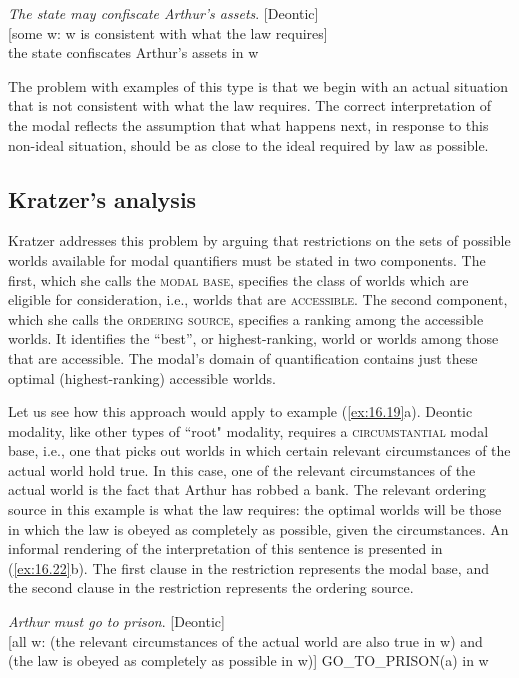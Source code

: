 \ea \label{ex:16.21}
\ea  \textit{The state may confiscate Arthur’s assets}. \hfill  [Deontic]\\
\ex{} [some w: w is consistent with what the law requires]\\
  the state confiscates Arthur’s assets in w
\z
\z


The problem with examples of this type is that we begin with an actual situation that is not consistent with what the law requires. The correct interpretation of the modal reflects the assumption that what happens next, in response to this non-ideal situation, should be as close to the ideal required by law as possible.


\subsection{Kratzer’s analysis}\label{sec:16.3.2}

Kratzer addresses this problem by arguing that restrictions on the sets of possible worlds available for modal quantifiers must be stated in two components. The first, which she calls the \textsc{modal base}, specifies the class of worlds which are eligible for consideration, i.e., worlds that are \textsc{accessible}. The second component, which she calls the \textsc{ordering source}, specifies a ranking among the accessible worlds. It identifies the “best”, or highest-ranking, world or worlds among those that are accessible. The modal’s domain of quantification contains just these optimal (highest-ranking) accessible worlds.



Let us see how this approach would apply to example (\ref{ex:16.19}a). Deontic modality, like other types of ``root" modality, requires a \textsc{circumstantial} modal base, i.e., one that picks out worlds in which certain relevant circumstances of the actual world hold true. In this case, one of the relevant circumstances of the actual world is the fact that Arthur has robbed a bank. The relevant ordering source in this example is what the law requires: the optimal worlds will be those in which the law is obeyed as completely as possible, given the circumstances. An informal rendering of the interpretation of this sentence is presented in (\ref{ex:16.22}b). The first clause in the restriction represents the modal base, and the second clause in the restriction represents the ordering source.


\ea \label{ex:16.22}
\ea  \textit{Arthur must go to prison}. \hfill  [Deontic]\\
\ex{} [all w: (the relevant circumstances of the actual world are also true in w) and (the law is obeyed as completely as possible in w)] GO\_TO\_PRISON(a) in w
\z
\z


